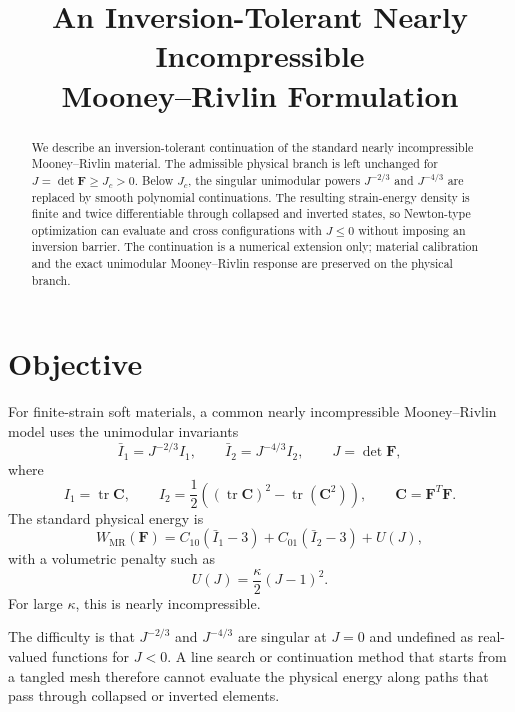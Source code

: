 \documentclass[11pt]{article}
\title{An Inversion-Tolerant Nearly Incompressible\\
Mooney--Rivlin Formulation}
\author{}
\date{}
\newcommand{\F}{\bm F}
\newcommand{\C}{\bm C}
\newcommand{\tr}{\operatorname{tr}}
\begin{document}
\maketitle

\begin{abstract}
We describe an inversion-tolerant continuation of the standard nearly
incompressible Mooney--Rivlin material. The admissible physical branch is left
unchanged for $J=\det\F\ge J_c>0$. Below $J_c$, the singular unimodular powers
$J^{-2/3}$ and $J^{-4/3}$ are replaced by smooth polynomial continuations.
The resulting strain-energy density is finite and twice differentiable through
collapsed and inverted states, so Newton-type optimization can evaluate and
cross configurations with $J\le0$ without imposing an inversion barrier. The
continuation is a numerical extension only; material calibration and the exact
unimodular Mooney--Rivlin response are preserved on the physical branch.
\end{abstract}

\section{Objective}

For finite-strain soft materials, a common nearly incompressible
Mooney--Rivlin model uses the unimodular invariants
\begin{equation}
  \bar I_1 = J^{-2/3} I_1,
  \qquad
  \bar I_2 = J^{-4/3} I_2,
  \qquad
  J=\det\F,
\end{equation}
where
\begin{equation}
  I_1=\tr\C,\qquad
  I_2=\frac{1}{2}\left((\tr\C)^2-\tr(\C^2)\right),
  \qquad
  \C=\F^T\F.
\end{equation}
The standard physical energy is
\begin{equation}
  W_{\mathrm{MR}}(\F)
  =
  C_{10}(\bar I_1-3)
  +
  C_{01}(\bar I_2-3)
  +
  U(J),
  \label{eq:physical_mr}
\end{equation}
with a volumetric penalty such as
\begin{equation}
  U(J)=\frac{\kappa}{2}(J-1)^2.
  \label{eq:volumetric}
\end{equation}
For large $\kappa$, this is nearly incompressible.

The difficulty is that $J^{-2/3}$ and $J^{-4/3}$ are singular at $J=0$ and
undefined as real-valued functions for $J<0$. A line search or continuation
method that starts from a tangled mesh therefore cannot evaluate the physical
energy along paths that pass through collapsed or inverted elements.
\end{document}
